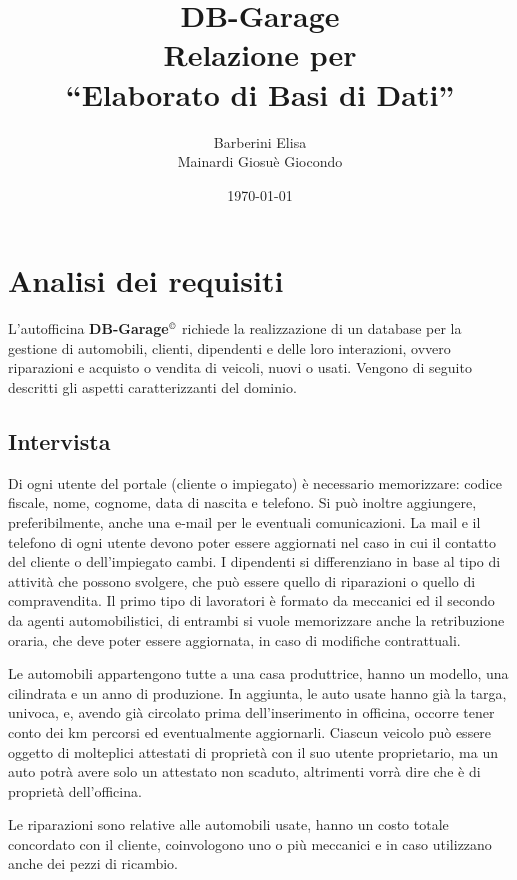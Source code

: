 \documentclass[a4paper,12pt]{report}
\title{\textbf{DB-Garage}\\Relazione per\\``Elaborato di Basi di Dati''}
\author{Barberini Elisa\\Mainardi Giosuè Giocondo}
\date{\today}
\begin{document}
\maketitle

\tableofcontents

\chapter{Analisi dei requisiti}
L'autofficina \textbf{DB-Garage}$^{\copyright}$ richiede la realizzazione di un database per la gestione di automobili,
%
clienti, dipendenti e delle loro interazioni, ovvero riparazioni e acquisto o vendita di veicoli, nuovi o usati. Vengono di seguito 
%
descritti gli aspetti caratterizzanti del dominio.

\section{Intervista}

Di ogni utente del portale (cliente o impiegato) è necessario memorizzare: codice fiscale, nome, cognome,
%
data di nascita e telefono. Si può inoltre aggiungere, preferibilmente, anche una e-mail per le eventuali comunicazioni. 
%
La mail e il telefono di ogni utente devono poter essere aggiornati nel caso in cui il contatto del cliente o dell'impiegato cambi.
%
I dipendenti si differenziano in base al tipo di attività che possono svolgere, che può essere quello di riparazioni o 
%
quello di compravendita.
%
Il primo tipo di lavoratori è formato da meccanici ed il secondo da agenti automobilistici, di entrambi si vuole memorizzare 
%
anche la retribuzione oraria, che deve poter essere aggiornata, in caso di modifiche contrattuali.

Le automobili appartengono tutte a una casa produttrice, hanno un modello, una cilindrata e un anno di produzione.
%
In aggiunta, le auto usate hanno già la targa, univoca, e, avendo già circolato prima dell'inserimento in officina, 
%
occorre tener conto dei km percorsi ed eventualmente aggiornarli.
%
Ciascun veicolo può essere oggetto di molteplici attestati di proprietà con il suo utente proprietario, 
%
ma un auto potrà avere solo un attestato non scaduto, altrimenti vorrà dire che è di proprietà dell'officina.

Le riparazioni sono relative alle automobili usate, hanno un costo totale concordato con il cliente, coinvologono
%
uno o più meccanici e in caso utilizzano anche dei pezzi di ricambio.
\end{document}
